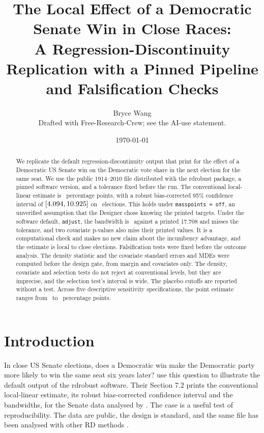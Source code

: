 \documentclass[11pt]{article}
\title{The Local Effect of a Democratic Senate Win in Close Races:\\
A Regression-Discontinuity Replication with a Pinned Pipeline and Falsification Checks}
\author{Bryce Wang \\ \small Drafted with Free-Research-Crew; see the AI-use statement.}
\date{\today}
\begin{document}
\maketitle

\begin{abstract}
We replicate the default regression-discontinuity output that \citet{calonico2017rdrobust} print for the effect of a Democratic US Senate win on the Democratic vote share in the next election for the same seat. We use the public 1914--2010 file distributed with the rdrobust package, a pinned software version, and a tolerance fixed before the run. The conventional local-linear estimate is \RdEffect\ percentage points, with a robust bias-corrected 95\% confidence interval of $[4.094, 10.925]$ on \RdN\ elections. This holds under \texttt{masspoints = off}, an unverified assumption that the Designer chose knowing the printed targets. Under the software default, \texttt{adjust}, the bandwidth is \RdAdjBw\ against a printed 17.708 and misses the tolerance, and two covariate p-values also miss their printed values. It is a computational check and makes no new claim about the incumbency advantage, and the estimate is local to close elections. Falsification tests were fixed before the outcome analysis. The density statistic and the covariate standard errors and MDEs were computed before the design gate, from margin and covariates only. The density, covariate and selection tests do not reject at conventional levels, but they are imprecise, and the selection test's interval is wide. The placebo cutoffs are reported without a test. Across five descriptive sensitivity specifications, the point estimate ranges from \RdSensDoubleEst\ to \RdSensHalfEst\ percentage points.
\end{abstract}

\section{Introduction}

In close US Senate elections, does a Democratic win make the Democratic party more likely to win the same seat six years later? \citet{calonico2017rdrobust} use this question to illustrate the default output of the rdrobust software. Their Section 7.2 prints the conventional local-linear estimate, its robust bias-corrected confidence interval and the bandwidths, for the Senate data analysed by \citet{cattaneo2015randomization}. The case is a useful test of reproducibility. The data are public, the design is standard, and the same file has been analysed with other RD methods \citep{cattaneo2016rdlocrand}.
\end{document}
